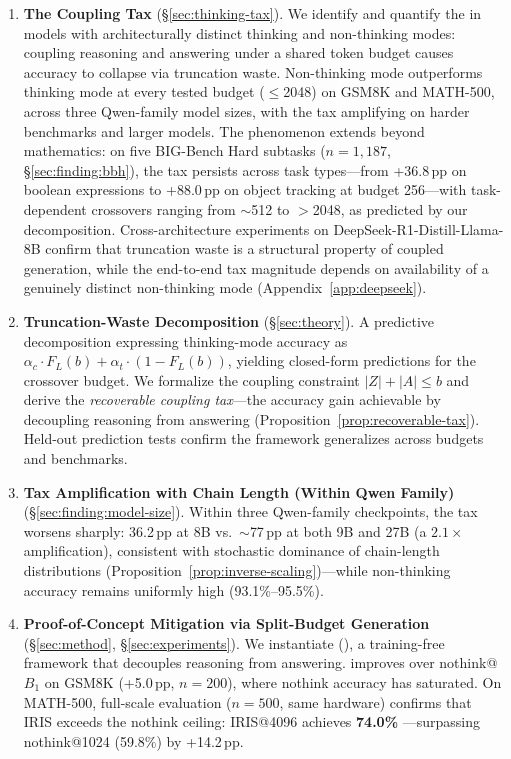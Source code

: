 \begin{enumerate}[nosep,leftmargin=*]
    \item \textbf{The Coupling Tax} (\S\ref{sec:thinking-tax}).
    We identify and quantify the \couplingtax{} in models with architecturally distinct thinking and non-thinking modes: coupling reasoning and answering under a shared token budget causes accuracy to collapse via truncation waste.
    Non-thinking mode outperforms thinking mode at every tested budget ($\leq$2048) on GSM8K and MATH-500, across three Qwen-family model sizes, with the tax amplifying on harder benchmarks and larger models.
    The phenomenon extends beyond mathematics: on five BIG-Bench Hard subtasks ($n{=}1{,}187$, \S\ref{sec:finding:bbh}), the tax persists across task types---from +36.8\,pp on boolean expressions to +88.0\,pp on object tracking at budget 256---with task-dependent crossovers ranging from ${\sim}$512 to ${>}$2048, as predicted by our decomposition.
    Cross-architecture experiments on DeepSeek-R1-Distill-Llama-8B confirm that truncation waste is a structural property of coupled generation, while the end-to-end tax magnitude depends on availability of a genuinely distinct non-thinking mode (Appendix~\ref{app:deepseek}).

    \item \textbf{Truncation-Waste Decomposition} (\S\ref{sec:theory}).
    A predictive decomposition expressing thinking-mode accuracy as $\alpha_c \cdot F_L(b) + \alpha_t \cdot (1 - F_L(b))$, yielding closed-form predictions for the crossover budget.
    We formalize the coupling constraint $|Z|{+}|A|{\le}b$ and derive the \emph{recoverable coupling tax}---the accuracy gain achievable by decoupling reasoning from answering (Proposition~\ref{prop:recoverable-tax}).
    Held-out prediction tests confirm the framework generalizes across budgets and benchmarks.

    \item \textbf{Tax Amplification with Chain Length (Within Qwen Family)} (\S\ref{sec:finding:model-size}).
    Within three Qwen-family checkpoints, the tax worsens sharply: 36.2\,pp at 8B vs.\ ${\sim}$77\,pp at both 9B and 27B (a $2.1\times$ amplification), consistent with stochastic dominance of chain-length distributions (Proposition~\ref{prop:inverse-scaling})---while non-thinking accuracy remains uniformly high (93.1\%--95.5\%).

    \item \textbf{Proof-of-Concept Mitigation via Split-Budget Generation} (\S\ref{sec:method}, \S\ref{sec:experiments}).
    We instantiate \method{} (\fullmethod{}), a training-free framework that decouples reasoning from answering.
    \method{} improves over nothink@$B_1$ on GSM8K (+5.0\,pp, $n{=}200$), where nothink accuracy has saturated.
    On MATH-500, full-scale evaluation ($n{=}500$, same hardware) confirms that IRIS exceeds the nothink ceiling: IRIS@4096 achieves \textbf{74.0\%} ---surpassing nothink@1024 (59.8\%) by +14.2\,pp.
\end{enumerate}
